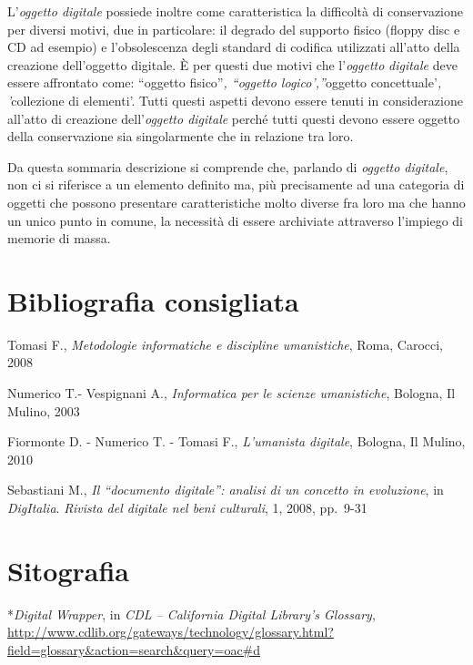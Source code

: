 \documentclass[
  b5paper,
  twoside,
  12pt,
  chapterprefix=false,
  bibliography=totocnumbered,
  parskip=false]{scrbook}
\begin{document}
L'\emph{oggetto digitale} possiede inoltre come caratteristica la difficoltà
di conservazione per diversi motivi, due in particolare: il degrado del
supporto fisico (floppy disc e CD ad esempio) e l'obsolescenza degli
standard di codifica utilizzati all'atto della creazione dell'oggetto
digitale. È per questi due motivi che l'\emph{oggetto} \emph{digitale} deve essere
affrontato come: \enquote{oggetto fisico}\emph{, \enquote{\emph{oggetto logico'},}}oggetto
concettuale'\emph{, '}collezione di elementi'. Tutti questi aspetti devono
essere tenuti in considerazione all'atto di creazione dell'\emph{oggetto
digitale} perché tutti questi devono essere oggetto della conservazione
sia singolarmente che in relazione tra loro.

Da questa sommaria descrizione si comprende che, parlando di \emph{oggetto
digitale}, non ci si riferisce a un elemento definito ma, più
precisamente ad una categoria di oggetti che possono presentare
caratteristiche molto diverse fra loro ma che hanno un unico punto in
comune, la necessità di essere archiviate attraverso l'impiego di
memorie di massa.

\hypertarget{bibliografia-consigliata-17}{%
\section*{Bibliografia consigliata}\label{bibliografia-consigliata-17}}

Tomasi F., \emph{Metodologie informatiche e discipline umanistiche}, Roma,
Carocci, 2008

Numerico T.- Vespignani A., \emph{Informatica per le scienze umanistiche},
Bologna, Il Mulino, 2003

Fiormonte D. - Numerico T. - Tomasi F., \emph{L'umanista digitale}, Bologna,
Il Mulino, 2010

Sebastiani M., \emph{Il \enquote{documento digitale}: analisi di un concetto in
evoluzione}, in \emph{DigItalia}. \emph{Rivista del digitale nel beni culturali},
1, 2008, pp.~9-31

\hypertarget{sitografia-23}{%
\section*{Sitografia}\label{sitografia-23}}

*\emph{Digital Wrapper}, in \emph{CDL -- California Digital Library's Glossary},
\url{http://www.cdlib.org/gateways/technology/glossary.html?field=glossary\&action=search\&query=oac\#d}
\end{document}
